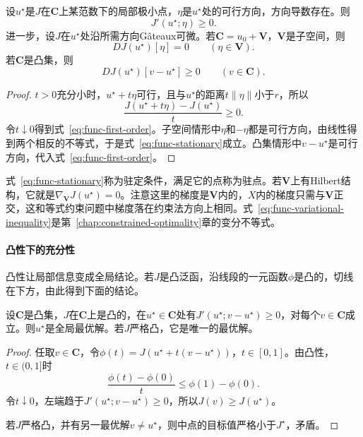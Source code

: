 \begin{theorem}[一阶必要条件]
\label{thm:func-first-order}
设$u^\star$是$J$在$\bm{C}$上某范数下的局部极小点，$\eta$是$u^\star$处的可行方向，方向导数存在。则
\begin{equation}
 J'(u^\star;\eta)\geq0.
 \label{eq:func-first-order}
\end{equation}
进一步，设$J$在$u^\star$处沿所需方向Gâteaux可微。若$\bm{C}=u_0+\bm{V}$，$\bm{V}$是子空间，则
\begin{equation}
 DJ(u^\star)[\eta]=0\qquad(\eta\in\bm{V}).
 \label{eq:func-stationary}
\end{equation}
若$\bm{C}$是凸集，则
\begin{equation}
 DJ(u^\star)[v-u^\star]\geq0\qquad(v\in\bm{C}).
 \label{eq:func-variational-inequality}
\end{equation}
\end{theorem}

\begin{proof}
$t>0$充分小时，$u^\star+t\eta$可行，且与$u^\star$的距离$t\lVert\eta\rVert$小于$r$，所以
\[
 \frac{J(u^\star+t\eta)-J(u^\star)}{t}\geq0.
\]
令$t\downarrow0$得到式~\eqref{eq:func-first-order}。子空间情形中$\eta$和$-\eta$都是可行方向，由线性得到两个相反的不等式，于是式~\eqref{eq:func-stationary}成立。凸集情形中$v-u^\star$是可行方向，代入式~\eqref{eq:func-first-order}。
\end{proof}

式~\eqref{eq:func-stationary}称为驻定条件，满足它的点称为驻点。若$\bm{V}$上有Hilbert结构，它就是$\nabla_{\bm{V}}J(u^\star)=0$。注意这里的梯度是$\bm{V}$内的，$X$内的梯度只需与$\bm{V}$正交，这和等式约束问题中梯度落在约束法方向上相同。式~\eqref{eq:func-variational-inequality}是第~\ref{chap:constrained-optimality}章的变分不等式。

\paragraph{凸性下的充分性}
凸性让局部信息变成全局结论。若$J$是凸泛函，沿线段的一元函数$\phi$是凸的，切线在下方，由此得到下面的结论。

\begin{theorem}[凸问题的充分条件]
\label{thm:func-convex-sufficient}
设$\bm{C}$是凸集，$J$在$\bm{C}$上是凸的，在$u^\star\in\bm{C}$处有$J'(u^\star;v-u^\star)\geq0$，对每个$v\in\bm{C}$成立。则$u^\star$是全局最优解。若$J$严格凸，它是唯一的最优解。
\end{theorem}

\begin{proof}
任取$v\in\bm{C}$，令$\phi(t)=J(u^\star+t(v-u^\star))$，$t\in[0,1]$。由凸性，$t\in(0,1]$时
\[
 \frac{\phi(t)-\phi(0)}{t}\leq\phi(1)-\phi(0).
\]
令$t\downarrow0$，左端趋于$J'(u^\star;v-u^\star)\geq0$，所以$J(v)\geq J(u^\star)$。

若$J$严格凸，并有另一最优解$v\neq u^\star$，则中点的目标值严格小于$J^\star$，矛盾。
\end{proof}

